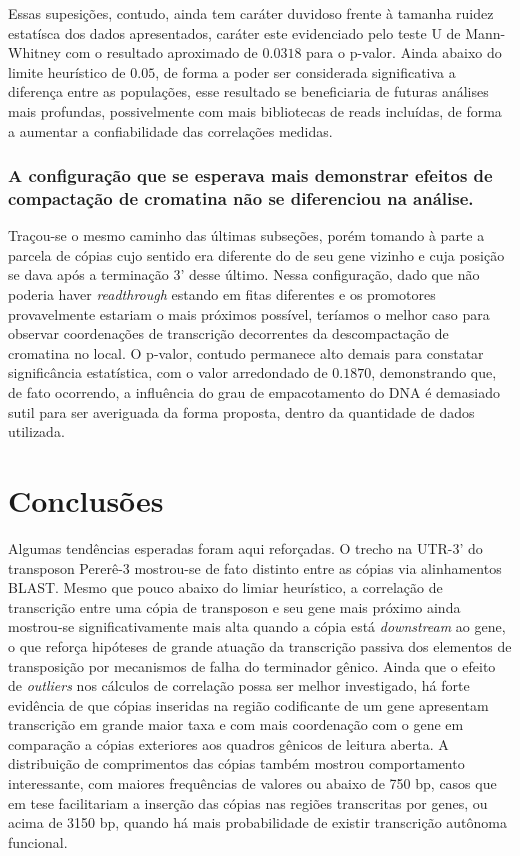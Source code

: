\documentclass[12pt]{article}
\begin{document}
\begin{multicols}{2}
Essas supesições, contudo, ainda tem caráter duvidoso frente à tamanha ruidez estatísca dos dados apresentados, caráter este evidenciado pelo teste U de Mann-Whitney com o resultado aproximado de \(0.0318\) para o p-valor. Ainda abaixo do limite heurístico de \(0.05\), de forma a poder ser considerada significativa a diferença entre as populações, esse resultado se beneficiaria de futuras análises mais profundas, possivelmente com mais bibliotecas de reads incluídas, de forma a aumentar a confiabilidade das correlações medidas.

\subsubsection{A configuração que se esperava mais demonstrar efeitos de compactação de cromatina não se diferenciou na análise.}
Traçou-se o mesmo caminho das últimas subseções, porém tomando à parte a parcela de cópias cujo sentido era diferente do de seu gene vizinho e cuja posição se dava após a terminação 3' desse último. Nessa configuração, dado que não poderia haver \textit{readthrough} estando em fitas diferentes e os promotores provavelmente estariam o mais próximos possível, teríamos o melhor caso para observar coordenações de transcrição decorrentes da descompactação de cromatina no local. O p-valor, contudo permanece alto demais para constatar significância estatística, com o valor arredondado de \(0.1870\), demonstrando que, de fato ocorrendo, a influência do grau de empacotamento do DNA é demasiado sutil para ser averiguada da forma proposta, dentro da quantidade de dados utilizada.

\section{Conclusões}
Algumas tendências esperadas foram aqui reforçadas. O trecho na UTR-3' do transposon Pererê-3 mostrou-se de fato distinto entre as cópias via alinhamentos BLAST. Mesmo que pouco abaixo do limiar heurístico, a correlação de transcrição entre uma cópia de transposon e seu gene mais próximo ainda mostrou-se significativamente mais alta quando a cópia está \textit{downstream} ao gene, o que reforça hipóteses de grande atuação da transcrição passiva dos elementos de transposição por mecanismos de falha do terminador gênico. Ainda que o efeito de \textit{outliers} nos cálculos de correlação possa ser melhor investigado, há forte evidência de que cópias inseridas na região codificante de um gene apresentam transcrição em grande maior taxa e com mais coordenação com o gene em comparação a cópias exteriores aos quadros gênicos de leitura aberta. A distribuição de comprimentos das cópias também mostrou comportamento interessante, com maiores frequências de valores ou abaixo de 750 bp, casos que em tese facilitariam a inserção das cópias nas regiões transcritas por genes, ou acima de 3150 bp, quando há mais probabilidade de existir transcrição autônoma funcional.

\end{multicols}
\end{document}
